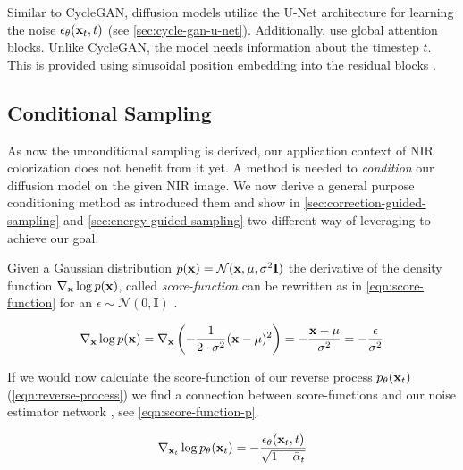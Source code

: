 

Similar to CycleGAN, diffusion models utilize the U-Net architecture for learning the noise $\epsilon_\theta(\mathbf{x}_t,t)$ \parencite{unet,mehri,ddpm,diffusion-beats-gans} (see \autoref{sec:cycle-gan-u-net}).
Additionally, \cite{diffusion-beats-gans} use global attention blocks.  
Unlike CycleGAN, the model needs information about the timestep $t$. This is provided using sinusoidal position embedding into the residual blocks \parencite{ddpm}.

\subsection{Conditional Sampling}
\label{sec:conditional-sampling}
As now the unconditional sampling is derived, our application context of NIR colorization does not benefit from it yet.
A method is needed to \textit{condition} our diffusion model on the given NIR image.
We now derive a general purpose conditioning method as \textcite{sbgm,diffusion-beats-gans} introduced them and show in \autoref{sec:correction-guided-sampling} and \autoref{sec:energy-guided-sampling}
two different way of leveraging to achieve our goal.

Given a Gaussian distribution $p(\mathbf{x}) = \mathcal{N}(\mathbf{x}, \mu, \sigma^2 \mathbf{I})$ the derivative of the density function $\nabla_{\mathbf{x}} \log p(\mathbf{x})$, called \textit{score-function} can be rewritten as in \autoref{eqn:score-function} for an $\epsilon \sim \mathcal{N}(0, \mathbf{I})$ \parencite{sbgm}.

\begin{equation}
   \label{eqn:score-function}
   \nabla_{\mathbf{x}} \log p(\mathbf{x}) = \nabla_{\mathbf{x}} \left( - \frac{1}{2\cdot\sigma^2}(\mathbf{x}-\mu)^2\right) = - \frac{\mathbf{x} - \mu}{\sigma^2} = - \frac{\epsilon}{\sigma^2}
\end{equation}

If we would now calculate the score-function of our reverse process $p_\theta(\mathbf{x}_t)$ (\autoref{eqn:reverse-process})
we find a connection between score-functions and our noise estimator network \parencite{sbgm}, see \autoref{eqn:score-function-p}.

\begin{equation}
   \label{eqn:score-function-p}
   \nabla_{\mathbf{x}_t} \log p_\theta(\mathbf{x}_t) = - \frac{\epsilon_\theta(\mathbf{x}_t, t)}{\sqrt{1 - \bar{\alpha}_t}}
\end{equation}

